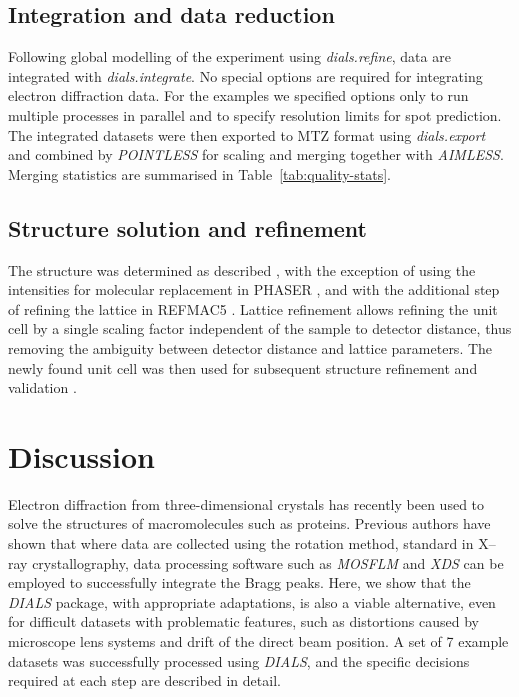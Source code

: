 \documentclass[preprint]{iucr}
\newcommand{\dials}{\emph{DIALS}\xspace}
\newcommand{\dialsrefine}{\emph{dials.refine}\xspace}
\newcommand{\dialsintegrate}{\emph{dials.integrate}\xspace}
\newcommand{\dialsexport}{\emph{dials.export}\xspace}
\newcommand{\xds}{\emph{XDS}\xspace}
\newcommand{\mosflm}{\emph{MOSFLM}\xspace}
\newcommand{\pointless}{\emph{POINTLESS}\xspace}
\newcommand{\aimless}{\emph{AIMLESS}\xspace}
\begin{document}
\subsection{Integration and data reduction}

Following global modelling of the experiment using \dialsrefine, data are
integrated with \dialsintegrate. No special options are required for integrating
electron diffraction data. For the examples we specified options only to
run multiple processes in parallel and to specify resolution limits for spot
prediction. The integrated datasets were then exported to MTZ format using
\dialsexport and combined by \pointless \cite{Evans2006} for scaling and merging
together with \aimless \cite{Evans2013}. Merging statistics are summarised in
Table~\ref{tab:quality-stats}.

\subsection{Structure solution and refinement \label{sec:phase-refine}}

The structure was determined as described \cite{Clabbers2017}, with the exception of
using the intensities for molecular replacement in PHASER \cite{McCoy2007,Read2016},
and with the additional step of refining the lattice in REFMAC5 \cite{Murshudov2011}.
Lattice refinement allows refining the unit cell by a single scaling factor independent
of the sample to detector distance, thus removing the ambiguity between detector
distance and lattice parameters. The newly found unit cell was then used for subsequent
structure refinement and validation \cite{Murshudov2011,Joosten2014,Luebben2015}.


\section{Discussion}

Electron diffraction from three-dimensional crystals has recently been used to
solve the structures of macromolecules such as proteins. Previous authors have
shown that where data are collected using the rotation method, standard in
X--ray crystallography, data processing software such as \mosflm and
\xds can be employed to successfully integrate the Bragg peaks. Here, we show
that the \dials package, with appropriate adaptations, is also a viable
alternative, even for difficult datasets with problematic features, such as
distortions caused by microscope lens systems and drift of the direct beam
position. A set of 7 example datasets was successfully processed using \dials,
and the specific decisions required at each step are described in detail.
\end{document}

